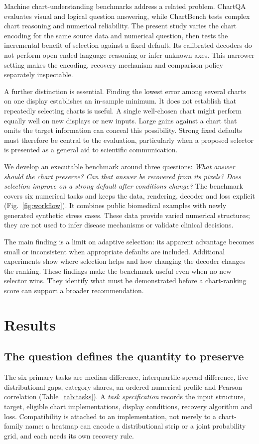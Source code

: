 \documentclass[11pt]{article}
\begin{document}
Machine chart-understanding benchmarks address a related problem. ChartQA evaluates visual and logical question answering, while ChartBench tests complex chart reasoning and numerical reliability.\cite{chartqa,chartbench} The present study varies the chart encoding for the same source data and numerical question, then tests the incremental benefit of selection against a fixed default. Its calibrated decoders do not perform open-ended language reasoning or infer unknown axes. This narrower setting makes the encoding, recovery mechanism and comparison policy separately inspectable.

A further distinction is essential. Finding the lowest error among several charts on one display establishes an in-sample minimum. It does not establish that repeatedly selecting charts is useful. A single well-chosen chart might perform equally well on new displays or new inputs. Large gains against a chart that omits the target information can conceal this possibility. Strong fixed defaults must therefore be central to the evaluation, particularly when a proposed selector is presented as a general aid to scientific communication.

We develop an executable benchmark around three questions: \emph{What answer should the chart preserve? Can that answer be recovered from its pixels? Does selection improve on a strong default after conditions change?} The benchmark covers six numerical tasks and keeps the data, rendering, decoder and loss explicit (Fig.~\ref{fig:workflow}). It combines public biomedical examples with newly generated synthetic stress cases. These data provide varied numerical structures; they are not used to infer disease mechanisms or validate clinical decisions.

The main finding is a limit on adaptive selection: its apparent advantage becomes small or inconsistent when appropriate defaults are included. Additional experiments show where selection helps and how changing the decoder changes the ranking. These findings make the benchmark useful even when no new selector wins. They identify what must be demonstrated before a chart-ranking score can support a broader recommendation.

\section*{Results}
\subsection*{The question defines the quantity to preserve}
The six primary tasks are median difference, interquartile-spread difference, five distributional gaps, category shares, an ordered numerical profile and Pearson correlation (Table~\ref{tab:tasks}). A \emph{task specification} records the input structure, target, eligible chart implementations, display conditions, recovery algorithm and loss. Compatibility is attached to an implementation, not merely to a chart-family name: a heatmap can encode a distributional strip or a joint probability grid, and each needs its own recovery rule.
\end{document}
